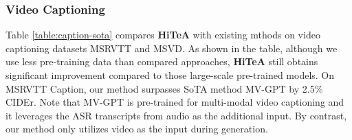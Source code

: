 \documentclass[10pt,twocolumn,letterpaper]{article}
\newcommand{\modelname}{\textbf{HiTeA}\xspace}
\begin{document}
\subsubsection{Video Captioning}
\vspace{-1ex}
Table \ref{table:caption-sota} compares \modelname with existing mthods on video captioning datasets MSRVTT and MSVD.
As shown in the table, although we use less pre-training data than compared approaches, \modelname still obtains significant improvement compared to those large-scale pre-trained models. On MSRVTT Caption, our method surpasses SoTA method MV-GPT \cite{seo2022mvgpt} by 2.5\% CIDEr. Note that MV-GPT is pre-trained for multi-modal video captioning and it leverages the ASR transcripts from audio as the additional input. By contrast, our method only utilizes video as the input during generation.
\end{document}
